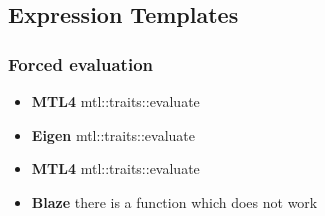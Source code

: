 \documentclass{article}
\begin{document}
\FloatBarrier

\subsection{Expression Templates}

\subsubsection{Forced evaluation}
\begin{itemize}
\item \textbf{MTL4} mtl::traits::evaluate \\
\item \textbf{Eigen} mtl::traits::evaluate \\
\item \textbf{MTL4} mtl::traits::evaluate \\
\item \textbf{Blaze} there is a function which does not work \\
\end{itemize}
\end{document}
